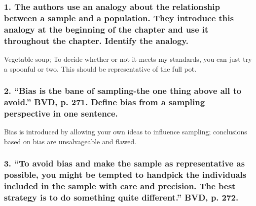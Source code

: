 \documentclass[letterpaper]{article}
\newcommand{\titleDOC}{}
\newcommand{\authorDOC}{Daniel Sabalakov}
\newcommand{\classDOC}{}
\begin{document}








\renewcommand{\classDOC}{DE Intro to Statistics I}

\renewcommand{\authorDOC}{Daniel Sabalakov}

\renewcommand{\titleDOC}{Ch. 12 Analysis}



\subsubsection{1. The authors use an analogy about the relationship between a sample and a population. They introduce this analogy at the beginning of the chapter and use it throughout the chapter. Identify the analogy.}\label{the-authors-use-an-analogy-about-the-relationship-between-a-sample-and-a-population.-they-introduce-this-analogy-at-the-beginning-of-the-chapter-and-use-it-throughout-the-chapter.-identify-the-analogy.}

Vegetable soup; To decide whether or not it meets my standards, you can just try a spoonful or two. This should be representative of the full pot.

\subsubsection{2. ``Bias is the bane of sampling-the one thing above all to avoid.'' BVD, p. 271. Define bias from a sampling perspective in one sentence.}\label{bias-is-the-bane-of-sampling-the-one-thing-above-all-to-avoid.-bvd-p.-271.-define-bias-from-a-sampling-perspective-in-one-sentence.}

Bias is introduced by allowing your own ideas to influence sampling; conclusions based on bias are unsalvageable and flawed.

\subsubsection{3. ``To avoid bias and make the sample as representative as possible, you might be tempted to handpick the individuals included in the sample with care and precision. The best strategy is to do something quite different.'' BVD, p. 272.}\label{to-avoid-bias-and-make-the-sample-as-representative-as-possible-you-might-be-tempted-to-handpick-the-individuals-included-in-the-sample-with-care-and-precision.-the-best-strategy-is-to-do-something-quite-different.-bvd-p.-272.}
\end{document}
